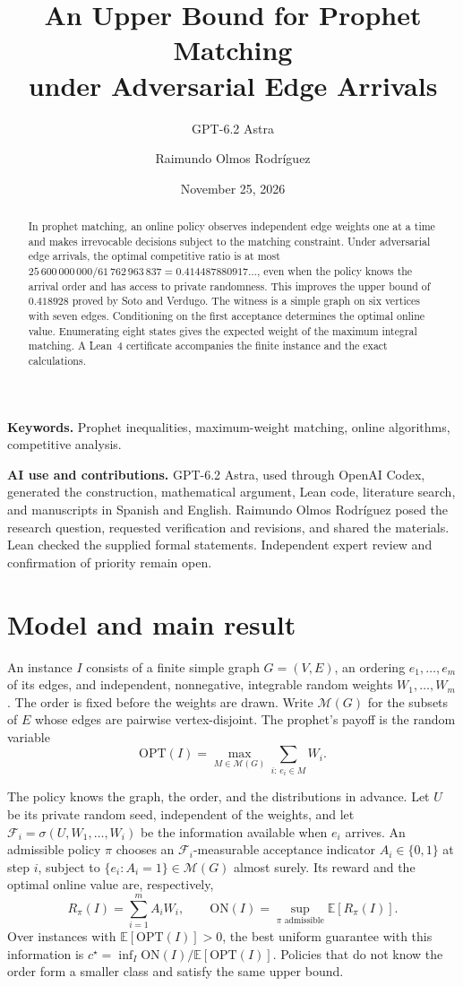 \documentclass[11pt,a4paper]{article}
\title{An Upper Bound for Prophet Matching\\[.35em]
under Adversarial Edge Arrivals}
\author{GPT-6.2 Astra \and Raimundo Olmos Rodríguez}
\date{November 25, 2026}
\newcommand{\E}{\mathbb{E}}
\newcommand{\OPT}{\mathrm{OPT}}
\newcommand{\numon}{25\,600\,000\,000}
\newcommand{\numoff}{61\,762\,963\,837}
\newcommand{\ON}{\mathrm{ON}}
\newcommand{\F}{\mathcal F}
\begin{document}
\maketitle
\begin{abstract}
In prophet matching, an online policy observes independent edge weights one at a time and makes irrevocable decisions subject to the matching constraint. Under adversarial edge arrivals, the optimal competitive ratio is at most \(\numon/\numoff=0.414487880917\ldots\), even when the policy knows the arrival order and has access to private randomness. This improves the upper bound of \(0.418928\) proved by Soto and Verdugo. The witness is a simple graph on six vertices with seven edges. Conditioning on the first acceptance determines the optimal online value. Enumerating eight states gives the expected weight of the maximum integral matching. A Lean~4 certificate accompanies the finite instance and the exact calculations.
\end{abstract}
\noindent\textbf{Keywords.} Prophet inequalities, maximum-weight matching, online algorithms, competitive analysis.

\medskip\noindent\textbf{AI use and contributions.} GPT-6.2 Astra, used through OpenAI Codex, generated the construction, mathematical argument, Lean code, literature search, and manuscripts in Spanish and English. Raimundo Olmos Rodríguez posed the research question, requested verification and revisions, and shared the materials. Lean checked the supplied formal statements. Independent expert review and confirmation of priority remain open.
\tableofcontents
\clearpage
\section{Model and main result}\label{sec:modelo}
An instance \(I\) consists of a finite simple graph \(G=(V,E)\), an ordering \(e_1,\ldots,e_m\) of its edges, and independent, nonnegative, integrable random weights \(W_1,\ldots,W_m\). The order is fixed before the weights are drawn. Write \(\mathcal M(G)\) for the subsets of \(E\) whose edges are pairwise vertex-disjoint. The prophet's payoff is the random variable
\[
  \OPT(I)=\max_{M\in\mathcal M(G)}\sum_{i:\,e_i\in M} W_i .
\]

The policy knows the graph, the order, and the distributions in advance. Let \(U\) be its private random seed, independent of the weights, and let \(\F_i=\sigma(U,W_1,\ldots,W_i)\) be the information available when \(e_i\) arrives. An admissible policy \(\pi\) chooses an \(\F_i\)-measurable acceptance indicator \(A_i\in\{0,1\}\) at step \(i\), subject to \(\{e_i:A_i=1\}\in\mathcal M(G)\) almost surely. Its reward and the optimal online value are, respectively,
\[
 R_\pi(I)=\sum_{i=1}^m A_iW_i,\qquad
 \ON(I)=\sup_{\pi\text{ admissible}}\E[R_\pi(I)].
\]
Over instances with \(\E[\OPT(I)]>0\), the best uniform guarantee with this information is \(c^\star=\inf_I \ON(I)/\E[\OPT(I)]\). Policies that do not know the order form a smaller class and satisfy the same upper bound.
\end{document}
